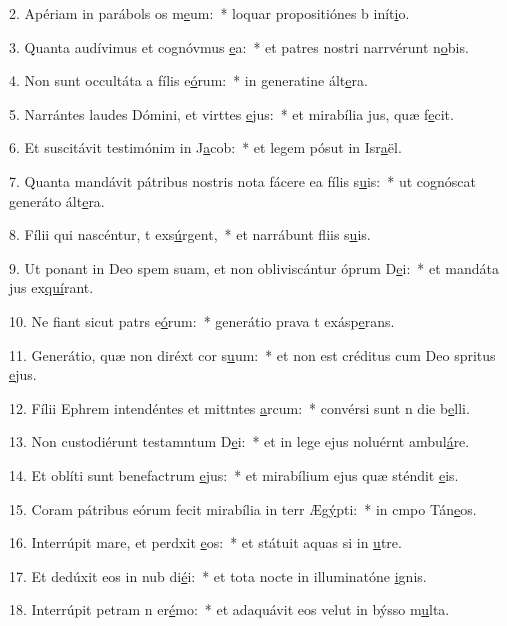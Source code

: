 2. Apériam in parábols os m\uline{e}um:~* loquar propositiónes b inít\uline{i}o.\par 
3. Quanta audívimus et cognóvmus \uline{e}a:~* et patres nostri narrvérunt n\uline{o}bis.\par 
4. Non sunt occultáta a fílis e\uline{ó}rum:~* in generatine ált\uline{e}ra.\par 
5. Narrántes laudes Dómini, et virttes \uline{e}jus:~* et mirabília jus, quæ f\uline{e}cit.\par 
6. Et suscitávit testimónim in J\uline{a}cob:~* et legem pósut in Isr\uline{a}ël.\par 
7. Quanta mandávit pátribus nostris nota fácere ea fílis s\uline{u}is:~* ut cognóscat generáto ált\uline{e}ra.\par 
8. Fílii qui nascéntur, t exs\uline{ú}rgent,~* et narrábunt fliis s\uline{u}is.\par 
9. Ut ponant in Deo spem suam, et non obliviscántur óprum D\uline{e}i:~* et mandáta jus ex\uline{quí}rant.\par 
10. Ne fiant sicut patrs e\uline{ó}rum:~* generátio prava t exásp\uline{e}rans.\par 
11. Generátio, quæ non diréxt cor s\uline{u}um:~* et non est créditus cum Deo spritus \uline{e}jus.\par 
12. Fílii Ephrem intendéntes et mittntes \uline{a}rcum:~* convérsi sunt n die b\uline{e}lli.\par 
13. Non custodiérunt testamntum D\uline{e}i:~* et in lege ejus noluérnt ambul\uline{á}re.\par 
14. Et oblíti sunt benefactrum \uline{e}jus:~* et mirabílium ejus quæ sténdit \uline{e}is.\par 
15. Coram pátribus eórum fecit mirabília in terr Æg\uline{ý}pti:~* in cmpo Tán\uline{e}os.\par 
16. Interrúpit mare, et perdxit \uline{e}os:~* et státuit aquas si in \uline{u}tre.\par 
17. Et dedúxit eos in nub di\uline{é}i:~* et tota nocte in illuminatóne \uline{i}gnis.\par 
18. Interrúpit petram n er\uline{é}mo:~* et adaquávit eos velut in býsso m\uline{u}lta.\par 
